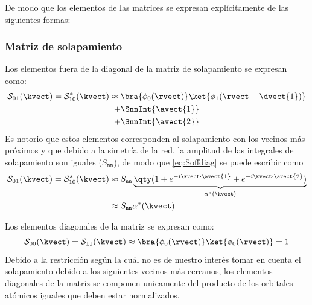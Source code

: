 De modo que los elementos de las matrices se expresan explícitamente de las 
siguientes formas:

\subsubsection{Matriz de solapamiento}
Los elementos fuera de la diagonal de la matriz de solapamiento se expresan como:
\begin{multline}\label{eq:Soffdiag}
\mathcal{S}_{01}(\kvect)=\mathcal{S}_{10}^*(\kvect)\approx\bra{\phi_{0}(\rvect)}\ket{\phi_{1}(\rvect - \dvect{1})} \\*+ \SnnInt{\avect{1}} \\*+ \SnnInt{\avect{2}}
\end{multline}
Es notorio que estos elementos corresponden al solapamiento con los vecinos más 
próximos y que debido a la simetría de la red, la amplitud de las integrales de 
solapamiento son iguales ($ S_{\mathtt{nn}} $), de modo que \eqref{eq:Soffdiag} se 
puede escribir como
\begin{equation}\label{eq:SoffdiagShort}
\begin{split}
\mathcal{S}_{01}(\kvect)=\mathcal{S}_{10}^*(\kvect)&\approx S_\mathtt{nn} \underbrace{\qty(1 + e^{-i\kvect\cdot\avect{1}} + e^{-i\kvect\cdot\avect{2}})}_{\alpha^*(\kvect)} \\*&\approx S_\mathtt{nn} \alpha^*(\kvect)
\end{split}
\end{equation}

Los elementos diagonales de la matriz se expresan como:
\begin{equation}\label{eq:Sdiag}
\mathcal{S}_{00}(\kvect) = \mathcal{S}_{11}(\kvect) \approx \bra{\phi_{0}(\rvect)}\ket{\phi_{0}(\rvect)} = 1
\end{equation}
Debido a la restricción según la cuál no es de nuestro interés tomar en cuenta el 
solapamiento debido a los siguientes vecinos más cercanos, los elementos diagonales 
de la matriz se componen unicamente del producto de los orbitales atómicos iguales 
que deben estar normalizados.

